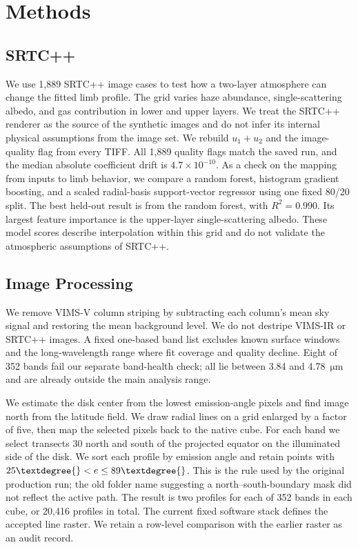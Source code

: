 \documentclass[tighten,linenumbers,twocolumn]{aastex631}
\begin{document}

\section{Methods}\label{section:methods}
\subsection{SRTC++} 
We use 1,889 SRTC++ image cases to test how a two-layer atmosphere can change the fitted limb profile. The grid varies haze abundance, single-scattering albedo, and gas contribution in lower and upper layers. We treat the SRTC++ renderer as the source of the synthetic images and do not infer its internal physical assumptions from the image set. We rebuild $u_1+u_2$ and the image-quality flag from every TIFF. All 1,889 quality flags match the saved run, and the median absolute coefficient drift is $4.7\times10^{-10}$. As a check on the mapping from inputs to limb behavior, we compare a random forest, histogram gradient boosting, and a scaled radial-basis support-vector regressor using one fixed 80/20 split. The best held-out result is from the random forest, with $R^2=0.990$. Its largest feature importance is the upper-layer single-scattering albedo. These model scores describe interpolation within this grid and do not validate the atmospheric assumptions of SRTC++.


\subsection{Image Processing}
\label{sec: image processing}

We remove VIMS-V column striping by subtracting each column's mean sky signal and restoring the mean background level. We do not destripe VIMS-IR or SRTC++ images. A fixed one-based band list excludes known surface windows and the long-wavelength range where fit coverage and quality decline. Eight of 352 bands fail our separate band-health check; all lie between 3.84 and 4.78~$\mathrm{\mu m}$ and are already outside the main analysis range.


We estimate the disk center from the lowest emission-angle pixels and find image north from the latitude field. We draw radial lines on a grid enlarged by a factor of five, then map the selected pixels back to the native cube. For each band we select transects 30\textdegree{} north and south of the projected equator on the illuminated side of the disk. We sort each profile by emission angle and retain points with $25\textdegree{} < e \leq 89\textdegree{}$. This is the rule used by the original production run; the old folder name suggesting a north--south-boundary mask did not reflect the active path. The result is two profiles for each of 352 bands in each cube, or 20,416 profiles in total. The current fixed software stack defines the accepted line raster. We retain a row-level comparison with the earlier raster as an audit record.
\end{document}

